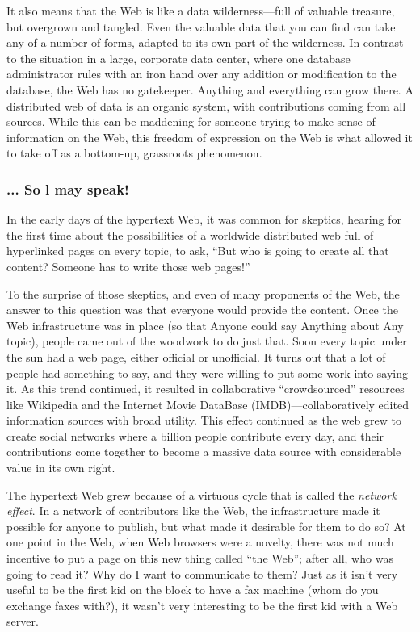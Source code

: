 It also means that the Web is like a data wilderness---full of valuable
treasure, but overgrown and tangled. Even the valuable data that you can
find can take any of a number of forms, adapted to its own part of the
wilderness. In contrast to the situation in a large, corporate data
center, where one database administrator rules with an iron hand over
any addition or modification to the database, the Web has no gatekeeper.
Anything and everything can grow there. A distributed web of data is an
organic system, with contributions coming from all sources. While this
can be maddening for someone trying to make sense of information on the
Web, this freedom of expression on the Web is what allowed it to take
off as a bottom-up, grassroots phenomenon.

\subsubsection{... So l may speak!}

In the early days of the hypertext Web, it was common for skeptics,
hearing for the first time about the possibilities of a worldwide
distributed web full of hyperlinked pages on every topic, to ask, ``But
who is going to create all that content? Someone has to write those web
pages!''

To the surprise of those skeptics, and even of many proponents of the
Web, the answer to this question was that everyone would provide the
content. Once the Web infrastructure was in place (so that Anyone could
say Anything about Any topic), people came out of the woodwork to do
just that. Soon every topic under the sun had a web page, either
official or unofficial. It turns out that a lot of people had something
to say, and they were willing to put some work into saying it. As this
trend continued, it resulted in collaborative ``crowdsourced'' resources
like Wikipedia and the Internet Movie DataBase (IMDB)---collaboratively
edited information sources with broad utility. This effect continued as
the web grew to create social networks where a billion people contribute
every day, and their contributions come together to become a massive
data source with considerable value in its own right.

The hypertext Web grew because of a virtuous cycle that is called the
\emph{network effect}. In a network of contributors like the Web, the
infrastructure made it possible for anyone to publish, but what made it
desirable for them to do so? At one point in the Web, when Web browsers
were a novelty, there was not much incentive to put a page on this new
thing called ``the Web''; after all, who was going to read it? Why do I
want to communicate to them? Just as it isn't very useful to be the
first kid on the block to have a fax machine (whom do you exchange faxes
with?), it wasn't very interesting to be the first kid with a Web
server.

